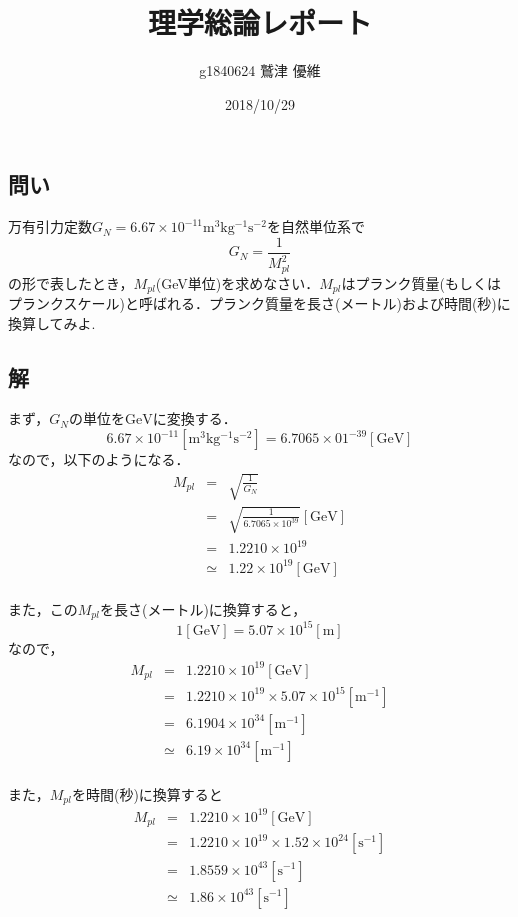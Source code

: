 \documentclass[10pt]{ujarticle}
\title{理学総論レポート}
\author{g1840624 鷲津 優維}
\date{2018/10/29}
\begin{document}
\maketitle
\section{}
\subsection{問い}
万有引力定数$G_N = 6.67×10^{-11} \mathrm{m^3 kg^{-1} s^{-2}}$を自然単位系で
\[
G_N = \frac{1}{M^2_{pl}}
\]
の形で表したとき，$M_{pl}$(GeV単位)を求めなさい．$M_{pl}$はプランク質量(もしくはプランクスケール)と呼ばれる．プランク質量を長さ(メートル)および時間(秒)に換算してみよ.

\subsection{解}
まず，$G_N$の単位を$\mathrm{GeV}$に変換する．
\[
6.67 \times 10^{-11} \mathrm{[m^3 kg^{-1} s^{-2}]} = 6.7065 ×01^{-39} \mathrm{[GeV]} 
\]
なので，以下のようになる．
\begin{eqnarray*}
M_{pl} &=& \sqrt{\frac{1}{G_N}} \\
&=& \sqrt{\frac{1}{6.7065 ×10^{39}}}\mathrm{[GeV]} \\
&=& 1.2210 \times 10^{19} \\
&\simeq& 1.22 \times 10^{19} \mathrm{[GeV]} \\
\end{eqnarray*}

また，この$M_{pl}$を長さ(メートル)に換算すると，
\[
1 \mathrm{[GeV]} = 5.07 \times 10^{15} \mathrm{[m]}
\]
なので，
\begin{eqnarray*}
  M_{pl} &=& 1.2210 \times 10^{19} \mathrm {[GeV]}\\
  &=& 1.2210 \times 10^{19} \times 5.07 \times 10^{15} \mathrm{[m^{-1}]} \\
  &=& 6.1904 \times 10^{34} \mathrm{[m^{-1}]} \\
  &\simeq& 6.19 \times 10^{34} \mathrm{[m^{-1}]} \\
\end{eqnarray*}

また，$M_{pl}$を時間(秒)に換算すると
\begin{eqnarray*}
  M_{pl} &=& 1.2210 \times 10^{19} \mathrm{[GeV]} \\
  &=& 1.2210 \times 10^{19} \times 1.52 \times 10^{24} \mathrm{[s^{-1}]} \\
  &=& 1.8559 \times 10^{43} \mathrm{[s^{-1}]} \\
  &\simeq& 1.86 \times 10^{43} \mathrm{[s^{-1}]} \\
\end{eqnarray*}
\end{document}
